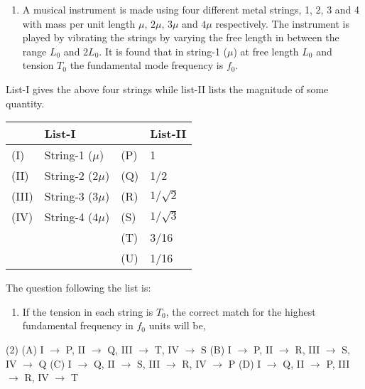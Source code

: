 \documentclass{article}
\begin{document}
\begin{enumerate}
\item A musical instrument is made using four different metal strings, 1, 2, 3 and 4 with mass per unit length $\mu$, $2\mu$, $3\mu$ and $4\mu$ respectively. The instrument is played by vibrating the strings by varying the free length in between the range $L_0$ and $2L_0$. It is found that in string-1 ($\mu$) at free length $L_0$ and tension $T_0$ the fundamental mode frequency is $f_0$.
\end{enumerate}

List-I gives the above four strings while list-II lists the magnitude of some quantity.

\begin{center}
    \renewcommand{\arraystretch}{2}
    \begin{table}[h]
        \centering
        \begin{tabular}{p{0.25cm}p{8cm}|p{0.25cm}p{5cm}}
        \hline
        & List-I & & List-II \\
        \hline
        (I) & String-1 ($\mu$) & (P) & 1\\
        (II) & String-2 ($2\mu$) & (Q) & 1/2\\
        (III) & String-3 ($3\mu$) & (R) & $1/\sqrt{2}$\\
        (IV) & String-4 ($4\mu$) & (S) & $1/\sqrt{3}$\\
        & & (T) & 3/16\\
        & & (U) & 1/16\\
        \hline
        \end{tabular}
    \end{table}
\end{center}

The question following the list is:

\begin{enumerate}[resume]
\item If the tension in each string is $T_0$, the correct match for the highest fundamental frequency in $f_0$ units will be,
\end{enumerate}

\begin{tasks}(2)
\task (A) I $\to$ P, II $\to$ Q, III $\to$ T, IV $\to$ S
\task (B) I $\to$ P, II $\to$ R, III $\to$ S, IV $\to$ Q
\task (C) I $\to$ Q, II $\to$ S, III $\to$ R, IV $\to$ P
\task (D) I $\to$ Q, II $\to$ P, III $\to$ R, IV $\to$ T
\end{tasks}
\end{document}
